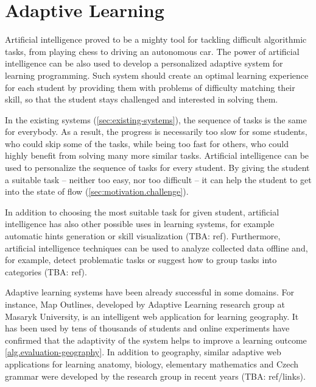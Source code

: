 \chapter{Adaptive Learning}
\label{chap:adaptive-learning}


Artificial intelligence proved to be a mighty tool
  for tackling difficult algorithmic tasks,
  from playing chess to driving an autonomous car.
The power of artificial intelligence can be also used
  to develop a personalized adaptive system for learning programming.
Such system should create an optimal learning experience for each student
  by providing them with problems of difficulty matching their skill,
  so that the student stays challenged and interested in solving them.

In the existing systems (\ref{sec:existing-systems}),
  the sequence of tasks is the same for everybody.
As a result, the progress is necessarily too slow for some students,
  who could skip some of the tasks,
  while being too fast for others,
  who could highly benefit from solving many more similar tasks.
Artificial intelligence can be used to personalize
  the sequence of tasks for every student.
By giving the student a suitable task
  -- neither too easy, nor too difficult --
  it can help the student to get into the state of flow
  (\ref{sec:motivation.challenge}).

In addition to choosing the most suitable task for given student,
  artificial intelligence has also other possible uses in learning systems,
  for example automatic hints generation \cite{generating-hints}
  or skill visualization (TBA: ref).
Furthermore, artificial intelligence techniques can be used
  to analyze collected data offline
  and, for example, detect problematic tasks
  or suggest how to group tasks into categories (TBA: ref).

Adaptive learning systems have been already successful in some domains.
For instance, Map Outlines,
  developed by Adaptive Learning research group at Masaryk University,
  is an intelligent web application for learning geography.
It has been used by tens of thousands of students
  and online experiments have confirmed
  that the adaptivity of the system helps to improve a learning outcome
  \ref{alg.evaluation-geography}.
In addition to geography, similar adaptive web applications
  for learning anatomy, biology, elementary mathematics and Czech grammar
  were developed by the research group in recent years
  (TBA: ref/links).

